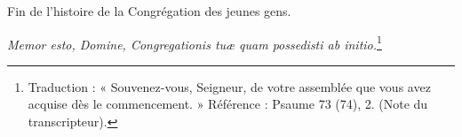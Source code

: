 \begin{center}
Fin de l'histoire de la Congrégation des jeunes gens.

\textit{Memor esto, Domine, Congregationis tuæ quam possedisti ab initio.}\footnote{Traduction : « Souvenez-vous, Seigneur, de votre assemblée que vous avez acquise dès le commencement. » Référence : Psaume 73 (74), 2. (Note du transcripteur).}
\end{center}

